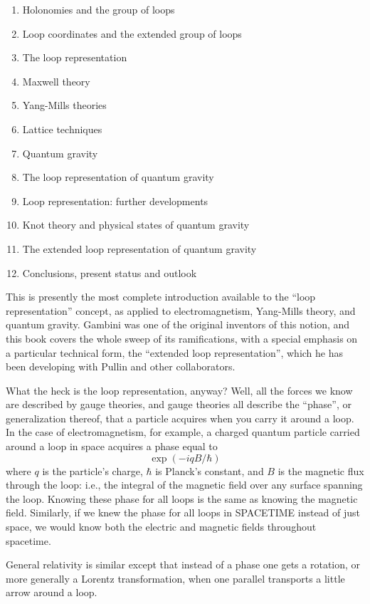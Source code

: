 \documentclass{article}
\def\tightlist{}
\begin{document}
\begin{enumerate}
\def\labelenumi{\arabic{enumi}.}
\tightlist
\item
  Holonomies and the group of loops
\item
  Loop coordinates and the extended group of loops
\item
  The loop representation
\item
  Maxwell theory
\item
  Yang-Mills theories
\item
  Lattice techniques
\item
  Quantum gravity
\item
  The loop representation of quantum gravity
\item
  Loop representation: further developments
\item
  Knot theory and physical states of quantum gravity
\item
  The extended loop representation of quantum gravity
\item
  Conclusions, present status and outlook
\end{enumerate}

This is presently the most complete introduction available to the ``loop
representation'' concept, as applied to electromagnetism, Yang-Mills
theory, and quantum gravity. Gambini was one of the original inventors
of this notion, and this book covers the whole sweep of its
ramifications, with a special emphasis on a particular technical form,
the ``extended loop representation'', which he has been developing with
Pullin and other collaborators.

What the heck is the loop representation, anyway? Well, all the forces
we know are described by gauge theories, and gauge theories all describe
the ``phase'', or generalization thereof, that a particle acquires when
you carry it around a loop. In the case of electromagnetism, for
example, a charged quantum particle carried around a loop in space
acquires a phase equal to \[\exp(-iqB/\hbar)\] where \(q\) is the
particle's charge, \(\hbar\) is Planck's constant, and \(B\) is the
magnetic flux through the loop: i.e., the integral of the magnetic field
over any surface spanning the loop. Knowing these phase for all loops is
the same as knowing the magnetic field. Similarly, if we knew the phase
for all loops in SPACETIME instead of just space, we would know both the
electric and magnetic fields throughout spacetime.

General relativity is similar except that instead of a phase one gets a
rotation, or more generally a Lorentz transformation, when one parallel
transports a little arrow around a loop.
\end{document}
